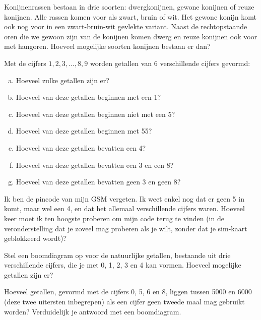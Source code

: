 \documentclass[12pt,a4paper,twoside]{article}
\begin{document}
\begin{oefening}
Konijnenrassen bestaan in drie soorten: dwergkonijnen, gewone konijnen of reuze konijnen. Alle rassen komen voor als zwart, bruin of wit. Het gewone konijn komt ook nog voor in een zwart-bruin-wit gevlekte variant. Naast de rechtopstaande oren die we gewoon zijn van de konijnen komen dwerg en reuze konijnen ook voor met hangoren. Hoeveel mogelijke soorten konijnen bestaan er dan?
\end{oefening}

\begin{oefening}
Met de cijfers $1, 2, 3, \ldots , 8, 9$ worden getallen van 6 verschillende cijfers gevormd:
\begin{enumerate}[(a)]
  \item Hoeveel zulke getallen zijn er?
  \item Hoeveel van deze getallen beginnen met een 1?
  \item Hoeveel van deze getallen beginnen niet met een 5?
  \item Hoeveel van deze getallen beginnen met 55?
  \item Hoeveel van deze getallen bevatten een 4?
  \item Hoeveel van deze getallen bevatten een 3 en een 8?
  \item Hoeveel van deze getallen bevatten geen 3 en geen 8?
\end{enumerate}
\end{oefening}

\begin{oefening}
Ik ben de pincode van mijn GSM vergeten. Ik weet enkel nog dat er geen 5 in komt, maar wel een 4, en dat het allemaal verschillende cijfers waren. Hoeveel keer moet ik ten hoogste proberen om mijn code terug te vinden (in de veronderstelling dat je zoveel mag proberen als je wilt, zonder dat je sim-kaart geblokkeerd wordt)?
\end{oefening}

\begin{oefening}
Stel een boomdiagram op voor de natuurlijke getallen, bestaande uit drie verschillende cijfers, die je met 0, 1, 2, 3 en 4 kan vormen. Hoeveel mogelijke getallen zijn er?
\end{oefening}

\begin{oefening}
Hoeveel getallen, gevormd met de cijfers 0, 5, 6 en 8, liggen tussen 5000 en 6000 (deze twee uitersten inbegrepen) als een cijfer geen tweede maal mag gebruikt worden? Verduidelijk je antwoord met een boomdiagram.
\end{oefening}
\end{document}

